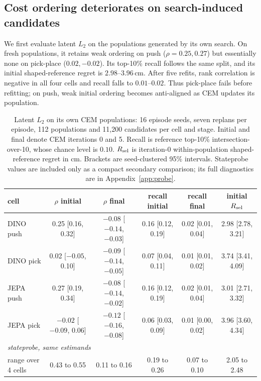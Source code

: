 \documentclass[10pt]{article}
\begin{document}
\subsection{Cost ordering deteriorates on search-induced candidates}
\label{sec:l2audit}

We first evaluate latent $L_2$ on the populations generated by its own search.
On fresh populations, it retains weak ordering on push ($\rho=0.25,0.27$) but
essentially none on pick-place ($0.02,-0.02$). Its top-10\% recall follows the
same split, and its initial shaped-reference regret is $2.98$--$3.96$\,cm. After
five refits, rank correlation is negative in all four cells and recall falls to
$0.01$--$0.02$. Thus pick-place fails before refitting; on push, weak initial
ordering becomes anti-aligned as CEM updates its population.

\begin{table}[H]
\centering
\footnotesize
\caption{Latent $L_2$ on its own CEM populations: 16 episode seeds, seven
replans per episode, 112 populations and 11,200 candidates per cell and stage.
Initial and final denote CEM iterations 0 and 5. Recall is reference top-10\%
intersection-over-10, whose chance level is $0.10$. $R_{\rm sel}$ is
iteration-0 within-population shaped-reference regret in cm. Brackets are
seed-clustered 95\% intervals. Stateprobe values are included only as a compact
secondary comparison; its full diagnostics are in Appendix~\ref{app:probe}.}
\label{tab:l2audit}
\begin{tabular}{lccccc}
\toprule
cell & $\rho$ initial & $\rho$ final & recall initial & recall final &
initial $R_{\rm sel}$ \\
\midrule
DINO push & 0.25 [0.16, 0.32] & $-0.08$ [$-0.14$, $-0.03$] &
0.16 [0.12, 0.19] & 0.02 [0.01, 0.04] & 2.98 [2.78, 3.21] \\
DINO pick & 0.02 [$-0.05$, 0.10] & $-0.09$ [$-0.14$, $-0.05$] &
0.07 [0.04, 0.11] & 0.01 [0.01, 0.02] & 3.74 [3.41, 4.09] \\
JEPA push & 0.27 [0.19, 0.34] & $-0.08$ [$-0.14$, $-0.02$] &
0.16 [0.12, 0.19] & 0.02 [0.01, 0.04] & 3.01 [2.71, 3.32] \\
JEPA pick & $-0.02$ [$-0.09$, 0.06] & $-0.12$ [$-0.16$, $-0.08$] &
0.06 [0.03, 0.09] & 0.01 [0.00, 0.02] & 3.96 [3.60, 4.34] \\
\midrule
\multicolumn{6}{l}{\emph{stateprobe, same estimands}} \\
range over 4 cells & 0.43 to 0.55 & 0.11 to 0.16 &
0.19 to 0.26 & 0.07 to 0.10 & 2.05 to 2.48 \\
\bottomrule
\end{tabular}
\end{table}
\end{document}
